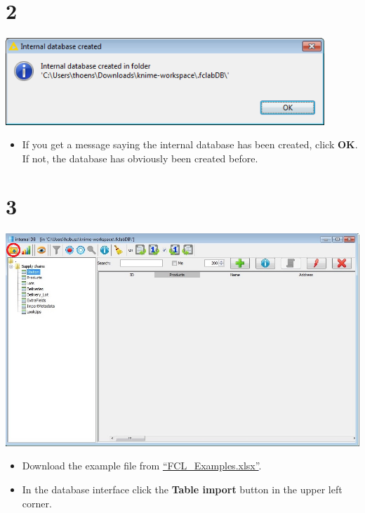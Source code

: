 \documentclass[10pt]{beamer}
\begin{document}
\section{2}
\begin{frame}
	\begin{center}
  		\includegraphics[width=0.9\textwidth]{2.png}
	\end{center}
	\begin{itemize}
		\item If you get a message saying the internal database has been created, click \textbf{OK}. If not, the database has obviously been created before.
	\end{itemize}
\end{frame}

\section{3}
\begin{frame}
	\begin{center}
  		\includegraphics[height=0.6\textheight]{3.png}
	\end{center}
	\begin{itemize}
		\item Download the example file from \textcolor{blue}{\underline{\href{https://github.com/SiLeBAT/BfROpenLabResources/raw/master/GitHubPages/documents/FCL_Create_a_FoodChain-Lab_Workflow/FCL_Examples.xlsx}{``FCL\_Examples.xlsx''}}}.
		\item In the database interface click the \textbf{Table import} button in the upper left corner.
	\end{itemize}
\end{frame}
\end{document}
